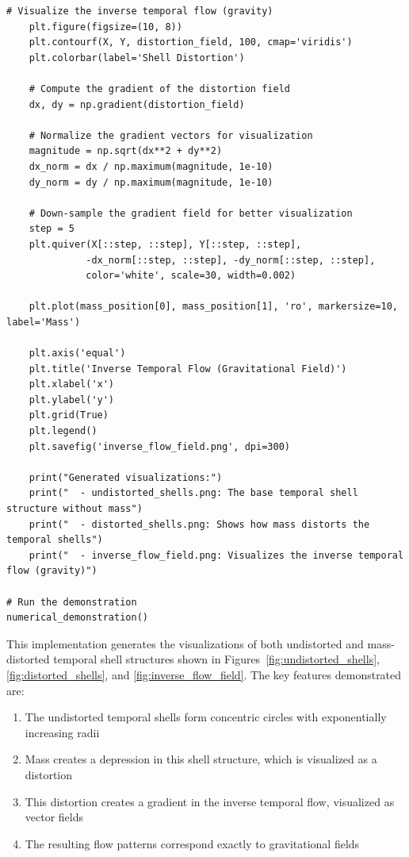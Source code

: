 \documentclass[12pt,a4paper]{article}
\begin{document}
\begin{lstlisting}[caption=Python implementation of numerical visualization of temporal shell distortion]
    # Visualize the inverse temporal flow (gravity)
    plt.figure(figsize=(10, 8))
    plt.contourf(X, Y, distortion_field, 100, cmap='viridis')
    plt.colorbar(label='Shell Distortion')
    
    # Compute the gradient of the distortion field
    dx, dy = np.gradient(distortion_field)
    
    # Normalize the gradient vectors for visualization
    magnitude = np.sqrt(dx**2 + dy**2)
    dx_norm = dx / np.maximum(magnitude, 1e-10)
    dy_norm = dy / np.maximum(magnitude, 1e-10)
    
    # Down-sample the gradient field for better visualization
    step = 5
    plt.quiver(X[::step, ::step], Y[::step, ::step], 
              -dx_norm[::step, ::step], -dy_norm[::step, ::step],
              color='white', scale=30, width=0.002)
    
    plt.plot(mass_position[0], mass_position[1], 'ro', markersize=10, label='Mass')
    
    plt.axis('equal')
    plt.title('Inverse Temporal Flow (Gravitational Field)')
    plt.xlabel('x')
    plt.ylabel('y')
    plt.grid(True)
    plt.legend()
    plt.savefig('inverse_flow_field.png', dpi=300)
    
    print("Generated visualizations:")
    print("  - undistorted_shells.png: The base temporal shell structure without mass")
    print("  - distorted_shells.png: Shows how mass distorts the temporal shells")
    print("  - inverse_flow_field.png: Visualizes the inverse temporal flow (gravity)")

# Run the demonstration
numerical_demonstration()
\end{lstlisting}

This implementation generates the visualizations of both undistorted and mass-distorted temporal shell structures shown in Figures~\ref{fig:undistorted_shells}, \ref{fig:distorted_shells}, and \ref{fig:inverse_flow_field}. The key features demonstrated are:

\begin{enumerate}
    \item The undistorted temporal shells form concentric circles with exponentially increasing radii
    \item Mass creates a depression in this shell structure, which is visualized as a distortion
    \item This distortion creates a gradient in the inverse temporal flow, visualized as vector fields
    \item The resulting flow patterns correspond exactly to gravitational fields
\end{enumerate}
\end{document}
